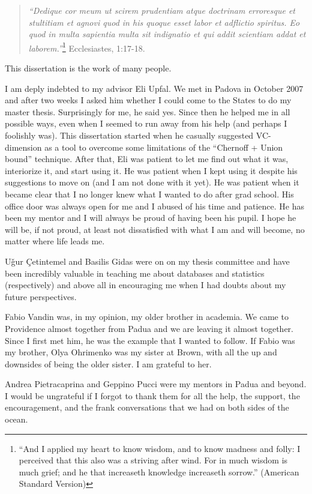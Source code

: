 \begin{quote}
  {\em ``Dedique cor meum ut scirem prudentiam atque doctrinam erroresque et
  stultitiam et agnovi quod in his quoque esset labor et adflictio spiritus. Eo
  quod in multa sapientia multa sit indignatio et qui addit scientiam addat et
  laborem.''}\footnote{``And I applied my heart to know wisdom, and to know madness
  and folly: I perceived that this also was a striving after wind. For in much
  wisdom is much grief; and he that increaseth knowledge increaseth sorrow.'' 
  (American Standard Version)} Ecclesiastes, 1:17-18.
\end{quote}

This dissertation is the work of many people.

I am deply indebted to my advisor Eli Upfal. We met in Padova in October 2007
and after two weeks I asked him whether I could come to the States to do my
master thesis. Surprisingly for me, he said yes. Since then he helped me in all
possible ways, even when I seemed to run away from his help (and perhaps I
foolishly was). This dissertation started when he casually suggested
VC-dimension as a tool to overcome some limitations of the ``Chernoff + Union
bound'' technique. After that, Eli was patient to let me find out what it was,
interiorize it, and start using it. He was patient when I kept using it despite
his suggestions to move on (and I am not done with it yet). He was patient when
it became clear that I no longer knew what I wanted to do after grad school. His
office door was always open for me and I abused of his time and patience. He has
been my mentor and I will always be proud of having been his pupil. I hope he
will be, if not proud, at least not dissatisfied with what I am and will become,
no matter where life leads me.  

U\v{g}ur \c{C}etintemel and Basilis Gidas were on on my thesis committee and have
been incredibly valuable in teaching me about databases and statistics
(respectively) and above all in encouraging me when I had doubts about my future
perspectives.

Fabio Vandin was, in my opinion, my older brother in academia. We came to
Providence almost together from Padua and we are leaving it almost together.
Since I first met him, he was the example that I wanted to follow. If Fabio was
my brother, Olya Ohrimenko was my sister at Brown, with all the up and downsides
of being the older sister. I am grateful to her.

Andrea Pietracaprina and Geppino Pucci were my mentors in Padua and beyond. I
would be ungrateful if I forgot to thank them for all the help, the support, the
encouragement, and the frank conversations that we had on both sides of the
ocean.

